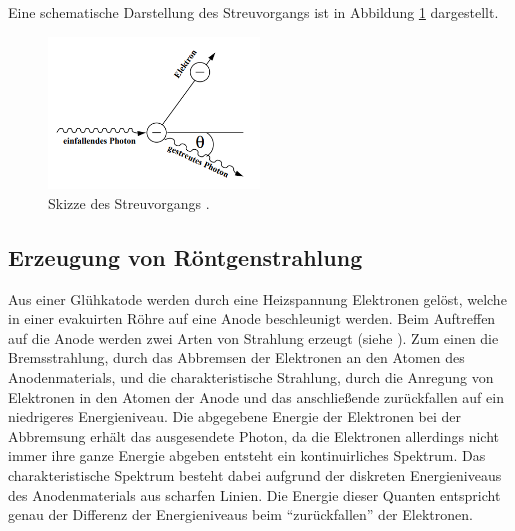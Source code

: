 Eine schematische Darstellung des Streuvorgangs ist in Abbildung \ref{fig:comptonstreuungskizze} dargestellt.
\begin{figure}
  \centering
  \includegraphics[width=0.5\textwidth]{bilder/comptonstreuung.png}
  \caption{Skizze des Streuvorgangs \cite{skript3}.}
  \label{fig:comptonstreuungskizze}
\end{figure}
\subsection{Erzeugung von Röntgenstrahlung}
Aus einer Glühkatode werden durch eine Heizspannung Elektronen gelöst, welche in einer evakuirten Röhre auf eine Anode beschleunigt werden. Beim Auftreffen auf die Anode werden
zwei Arten von Strahlung erzeugt (siehe \cite{skript4}). Zum einen die Bremsstrahlung, durch das Abbremsen der Elektronen an den Atomen des Anodenmaterials, und die charakteristische Strahlung, durch die
Anregung von Elektronen in den Atomen der Anode und das anschließende zurückfallen auf ein niedrigeres Energieniveau. Die abgegebene Energie der Elektronen bei der Abbremsung erhält das ausgesendete Photon, da die Elektronen 
allerdings nicht immer ihre ganze Energie abgeben entsteht ein kontinuirliches Spektrum. Das charakteristische Spektrum besteht dabei aufgrund der diskreten Energieniveaus des Anodenmaterials aus scharfen Linien. Die Energie dieser 
Quanten entspricht genau der Differenz der Energieniveaus beim \enquote{zurückfallen} der Elektronen.

